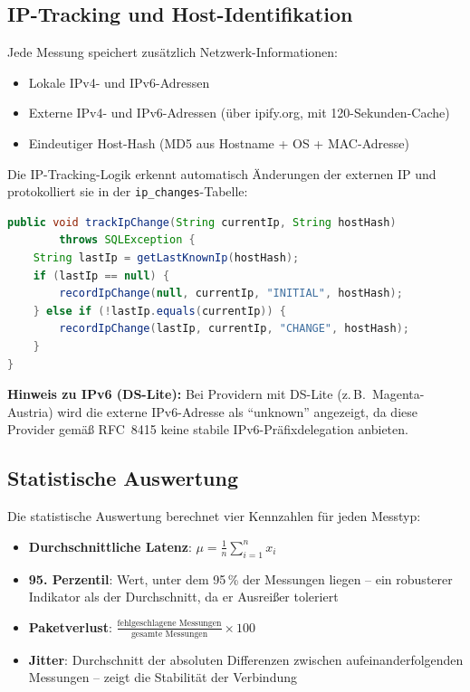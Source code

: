 \subsection{IP-Tracking und Host-Identifikation}

Jede Messung speichert zusätzlich Netzwerk-Informationen:
\begin{itemize}
  \item Lokale IPv4- und IPv6-Adressen
  \item Externe IPv4- und IPv6-Adressen (über ipify.org, mit 120-Sekunden-Cache)
  \item Eindeutiger Host-Hash (MD5 aus Hostname + OS + MAC-Adresse)
\end{itemize}

Die IP-Tracking-Logik erkennt automatisch Änderungen der externen IP und protokolliert
sie in der \texttt{ip\_changes}-Tabelle:

\begin{lstlisting}[language=Java, caption={IP-Aenderungserkennung}]
public void trackIpChange(String currentIp, String hostHash)
        throws SQLException {
    String lastIp = getLastKnownIp(hostHash);
    if (lastIp == null) {
        recordIpChange(null, currentIp, "INITIAL", hostHash);
    } else if (!lastIp.equals(currentIp)) {
        recordIpChange(lastIp, currentIp, "CHANGE", hostHash);
    }
}
\end{lstlisting}

\textbf{Hinweis zu IPv6 (DS-Lite):} Bei Providern mit DS-Lite (z.\,B.\ Magenta-Austria)
wird die externe IPv6-Adresse als ``unknown'' angezeigt, da diese Provider gemäß
RFC~8415 keine stabile IPv6-Präfixdelegation anbieten.

\subsection{Statistische Auswertung}

Die statistische Auswertung berechnet vier Kennzahlen für jeden Messtyp:

\begin{itemize}
  \item \textbf{Durchschnittliche Latenz}: $\mu = \frac{1}{n}\sum_{i=1}^{n}x_i$
  \item \textbf{95. Perzentil}: Wert, unter dem 95\,\% der Messungen liegen --
    ein robusterer Indikator als der Durchschnitt, da er Ausreißer toleriert
  \item \textbf{Paketverlust}: $\frac{\text{fehlgeschlagene Messungen}}{\text{gesamte Messungen}} \times 100$
  \item \textbf{Jitter}: Durchschnitt der absoluten Differenzen zwischen
    aufeinanderfolgenden Messungen -- zeigt die Stabilität der Verbindung
\end{itemize}


